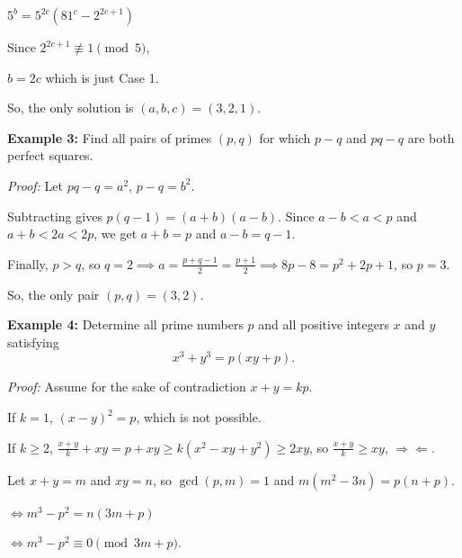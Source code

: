 \documentclass[10pt,letterpaper]{article}
\begin{document}
$5^b=5^{2c}(81^c-2^{2c+1})$

Since $2^{2c+1}\not\equiv 1 \pmod5$,

$b=2c$ which is just Case 1.

So, the only solution is $(a,b,c)=(3,2,1)$.
\nopagebreak[4]\par{}
\par\vspace{12pt}
\begin{tcolorbox}[breakable,title={USAMO 2022 P4 / USAJMO 2022 P5},colbacktitle=black!4,coltitle=black,fonttitle=\normalfont]
\textbf{Example 3:} Find all pairs of primes $(p, q)$ for which $p-q$ and $pq-q$ are both perfect squares.
\end{tcolorbox}
\textit{Proof:}
Let $pq-q=a^2$, $p-q=b^2$.

Subtracting gives $p(q-1)=(a+b)(a-b)$. Since $a-b<a<p$ and $a+b<2a<2p$, we get $a+b=p$ and $a-b=q-1$.

Finally, $p>q$, so $q=2\implies a=\frac{p+q-1}{2}=\frac{p+1}{2}\implies 8p-8=p^2+2p+1$, so $p=3$.

So, the only pair $(p,q)=(3,2)$.
\nopagebreak[4]\par{}
\par\vspace{12pt}
\begin{tcolorbox}[breakable,title={Romanian Master of Mathematics 2023 P1},colbacktitle=black!4,coltitle=black,fonttitle=\normalfont]
\textbf{Example 4:} Determine all prime numbers $p$ and all positive integers $x$ and $y$ satisfying $$x^3+y^3=p(xy+p).$$
\end{tcolorbox}
\textit{Proof:}
Assume for the sake of contradiction $x+y=kp$.

If $k=1$, $(x-y)^2=p$, which is not possible.

If $k\ge 2$, $\frac{x+y}{k}+xy=p+xy\ge k(x^2-xy+y^2)\ge 2xy$, so $\frac{x+y}{k}\ge xy$, $\Rightarrow \Leftarrow$.

Let $x+y=m$ and $xy=n$, so $\gcd(p,m)=1$ and $m(m^2-3n)=p(n+p)$.

$\iff m^3-p^2=n(3m+p)$

$\iff m^3-p^2\equiv 0\pmod{3m+p}$.
\end{document}
